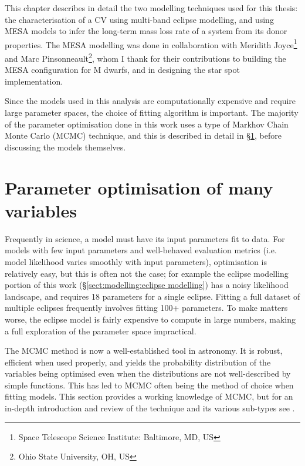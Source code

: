 \label{chpt:modelling and techniques}

This chapter describes in detail the two modelling techniques used for this thesis: the characterisation of a CV using multi-band eclipse modelling, and using MESA models to infer the long-term mass loss rate of a system from its donor properties.
The MESA modelling was done in collaboration with Meridith Joyce\footnote{Space Telescope Science Institute: Baltimore, MD, US} and Marc Pinsonneault\footnote{Ohio State University, OH, US}, whom I thank for their contributions to building the MESA configuration for M dwarfs, and in designing the star spot implementation.

Since the models used in this analysis are computationally expensive and require large parameter spaces, the choice of fitting algorithm is important. The majority of the parameter optimisation done in this work uses a type of Markhov Chain Monte Carlo (MCMC) technique, and this is described in detail in \S\ref{sect:modelling:parameter optimisation of many variables}, before discussing the models themselves.


\section{Parameter optimisation of many variables}
\label{sect:modelling:parameter optimisation of many variables}
Frequently in science, a model must have its input parameters fit to data. For models with few input parameters and well-behaved evaluation metrics (i.e. model likelihood varies smoothly with input parameters), optimisation is relatively easy, but this is often not the case; for example the eclipse modelling portion of this work (\S\ref{sect:modelling:eclipse modelling}) has a noisy likelihood landscape, and requires 18 parameters for a single eclipse. Fitting a full dataset of multiple eclipses frequently involves fitting 100+ parameters. To make matters worse, the eclipse model is fairly expensive to compute in large numbers, making a full exploration of the parameter space impractical.

The MCMC method is now a well-established tool in astronomy. It is robust, efficient when used properly, and yields the probability distribution of the variables being optimised even when the distributions are not well-described by simple functions. This has led to MCMC often being the method of choice when fitting models.
This section provides a working knowledge of MCMC, but for an in-depth introduction and review of the technique and its various sub-types see \citet{sharma2017}.


